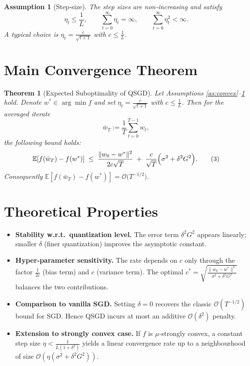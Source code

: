 \documentclass{article}
\newtheorem{theorem}{Theorem}
\newtheorem{assumption}{Assumption}
\newcommand{\E}{\mathbb{E}}
\begin{document}
\begin{assumption}[Step‑size]\label{as:steps}
The step sizes are non‑increasing and satisfy
\[
\eta_t\le \frac{1}{L},\qquad 
\sum_{t=0}^{\infty}\eta_t =\infty,\qquad 
\sum_{t=0}^{\infty}\eta_t^{2}<\infty.
\]
A typical choice is $\eta_t=\frac{c}{\sqrt{t+1}}$ with $c\le \frac{1}{L}$.
\end{assumption}

\section*{Main Convergence Theorem}
\begin{theorem}[Expected Suboptimality of QSGD]\label{thm:main}
Let Assumptions \ref{as:convex}–\ref{as:steps} hold. Denote $w^{*}\in\arg\min f$ and set $\eta_t=\frac{c}{\sqrt{t+1}}$ with $c\le \frac{1}{L}$. Then for the averaged iterate
\[
\bar w_T:=\frac{1}{T}\sum_{t=0}^{T-1} w_t,
\]
the following bound holds:
\[
\E\!\left[f(\bar w_T)-f(w^{*})\right]
\;\le\;
\frac{\|w_{0}-w^{*}\|^{2}}{2c\sqrt{T}}
\;+\;
\frac{c}{\sqrt{T}}\Bigl(\sigma^{2}+ \delta^{2}G^{2}\Bigr).
\tag{3}
\]
Consequently $\E[f(\bar w_T)-f(w^{*})]=\mathcal{O}\!\big(T^{-1/2}\big)$.
\end{theorem}

\section*{Theoretical Properties}
\begin{itemize}[leftmargin=*]
\item \textbf{Stability w.r.t.\ quantization level.} The error term $\delta^{2}G^{2}$ appears linearly; smaller $\delta$ (finer quantization) improves the asymptotic constant.
\item \textbf{Hyper‑parameter sensitivity.} The rate depends on $c$ only through the factor $\frac{1}{2c}$ (bias term) and $c$ (variance term). The optimal $c^{*}= \sqrt{\frac{\|w_{0}-w^{*}\|^{2}}{\sigma^{2}+\delta^{2}G^{2}}}$ balances the two contributions.
\item \textbf{Comparison to vanilla SGD.} Setting $\delta=0$ recovers the classic $\mathcal{O}(T^{-1/2})$ bound for SGD. Hence QSGD incurs at most an additive $\mathcal{O}(\delta^{2})$ penalty.
\item \textbf{Extension to strongly convex case.} If $f$ is $\mu$‑strongly convex, a constant step size $\eta<\frac{1}{L(1+\delta^{2})}$ yields a linear convergence rate up to a neighbourhood of size $\mathcal{O}(\eta(\sigma^{2}+\delta^{2}G^{2}))$.
\end{itemize}
\end{document}
